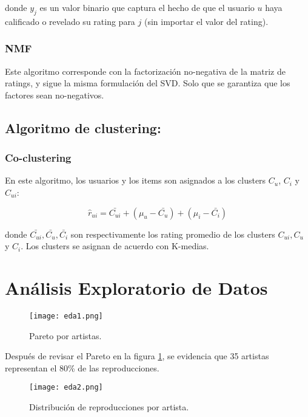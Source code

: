 \documentclass{article}
\begin{document}
donde $y_j$ es un valor binario que captura el hecho de que el usuario $u$ haya calificado o revelado su rating para $j$ (sin importar el valor del rating).

\subsubsection{NMF}

Este algoritmo corresponde con la factorización no-negativa de la matriz de ratings, y sigue la misma formulación del SVD. Solo que se garantiza que los factores sean no-negativos.


\subsection{Algoritmo de clustering:}

\subsubsection{Co-clustering}

En este algoritmo, los usuarios y los items son asignados a los clusters $C_u$, $C_i$ y $C_{ui}$:

\begin{equation}
\hat r_{ui}=\bar{C_{ui}} + (\mu_u - \bar{C_u}) + (\mu_i - \bar{C_i})
\end{equation}

donde $\bar{C_{ui}}, \bar{C_u}, \bar{C_i}$ son respectivamente los rating promedio de los clusters $C_{ui}, C_u$ y $C_i$. Los clusters se asignan de acuerdo con K-medias.

\section{Análisis Exploratorio de Datos}
\label{appendix:b}

\begin{figure}[h]
    \centering
	\texttt{[image: eda1.png]}
    \caption{Pareto por artistas.}
    \label{fig:eda1}
\end{figure}

Después de revisar el Pareto en la figura \ref{fig:eda1}, se evidencia que 35 artistas representan el 80\% de las reproducciones.

\begin{figure}[h]
    \centering
	\texttt{[image: eda2.png]}
    \caption{Distribución de reproducciones por artista.}
    \label{fig:eda2}
\end{figure}
\end{document}
